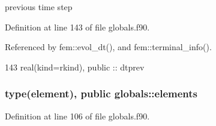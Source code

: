 previous time step 



Definition at line 143 of file globals.\+f90.



Referenced by fem\+::evol\+\_\+dt(), and fem\+::terminal\+\_\+info().


\begin{DoxyCode}
143   \textcolor{keywordtype}{real(kind=rkind)}, \textcolor{keywordtype}{public} :: dtprev
\end{DoxyCode}
\subsubsection[{elements}]{\setlength{\rightskip}{0pt plus 5cm}type({\bf element}), public globals\+::elements}\label{namespaceglobals_a120091f0ef12f971ed2c64514ea3ef2a}


Definition at line 106 of file globals.\+f90.



